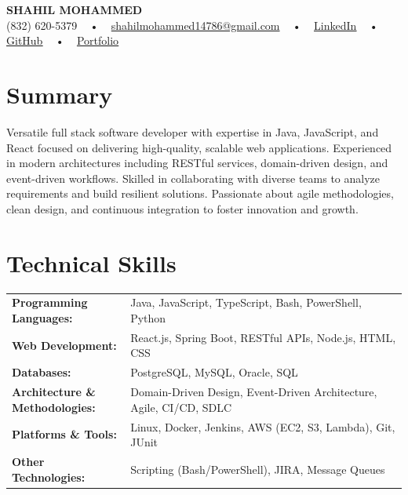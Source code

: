 \documentclass[letterpaper,11pt]{article}
\begin{document}
\begin{center}
    {\fontsize{14pt}{12pt}\selectfont \textbf{\MakeUppercase{Shahil Mohammed}}}\\ \vspace{2pt}
    \fontsize{10pt}{12pt}\selectfont (832) 620-5379 ~ • ~ \href{mailto:shahilmohammed14786@gmail.com}{shahilmohammed14786@gmail.com} ~ • ~  
    \href{https://www.linkedin.com/in/shahil-mohammed-9652931a1/}{\color{blue}\underline{LinkedIn}}  ~ • ~ 
    \href{https://github.com/freakbeast14}{\color{blue}\underline{GitHub}} ~ • ~ 
    \href{https://shahil-mohammed.netlify.app/}{\color{blue}\underline{Portfolio}}
    \vspace{-8pt}
\end{center}

\section{Summary}
\fontsize{9pt}{10pt}\selectfont
Versatile full stack software developer with expertise in Java, JavaScript, and React focused on delivering high-quality, scalable web applications. Experienced in modern architectures including RESTful services, domain-driven design, and event-driven workflows. Skilled in collaborating with diverse teams to analyze requirements and build resilient solutions. Passionate about agile methodologies, clean design, and continuous integration to foster innovation and growth.

 \vspace{-5pt}
 
\section{Technical Skills}
        \vspace{-14pt}
        \begin{table}[h]
            \fontsize{9pt}{10pt}\selectfont
            \begin{tabular}{p{0.3\linewidth} p{0.7\linewidth}}
                \textbf{Programming Languages:} & Java, JavaScript, TypeScript, Bash, PowerShell, Python \\
                \textbf{Web Development:} & React.js, Spring Boot, RESTful APIs, Node.js, HTML, CSS \\
                \textbf{Databases:} & PostgreSQL, MySQL, Oracle, SQL \\
                \textbf{Architecture \& Methodologies:} & Domain-Driven Design, Event-Driven Architecture, Agile, CI/CD, SDLC \\
                \textbf{Platforms \& Tools:} & Linux, Docker, Jenkins, AWS (EC2, S3, Lambda), Git, JUnit \\
                \textbf{Other Technologies:} & Scripting (Bash/PowerShell), JIRA, Message Queues \\
            \end{tabular}
        \end{table}
 \vspace{-15pt}
 
\end{document}

